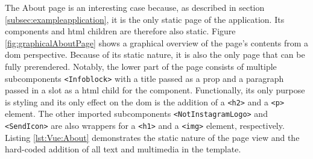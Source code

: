 \documentclass[a4paper, 12pt]{article}
\begin{document}
The About page is an interesting case because, as described in section \ref{subsec:exampleapplication}, it is the only static page of the application.
Its components and \acrshort{html} children are therefore also static.
Figure \ref{fig:graphicalAboutPage} shows a graphical overview of the page's contents from a \acrshort{dom} perspective.
Because of its static nature, it is also the only page that can be fully prerendered.
Notably, the lower part of the page consists of multiple subcomponents \verb|<Infoblock>| with a title passed as a prop and a paragraph passed in a slot as a \acrshort{html} child for the component.
Functionally, its only purpose is styling and its only effect on the \acrshort{dom} is the addition of a \verb|<h2>| and a \verb|<p>| element.
The other imported subcomponents \verb|<NotInstagramLogo>| and \verb|<SendIcon>| are also wrappers for a \verb|<h1>| and a \verb|<img>| element, respectively.
Listing \ref{lst:Vue:About} demonstrates the static nature of the page view and the hard-coded addition of all text and multimedia in the template.
\end{document}
